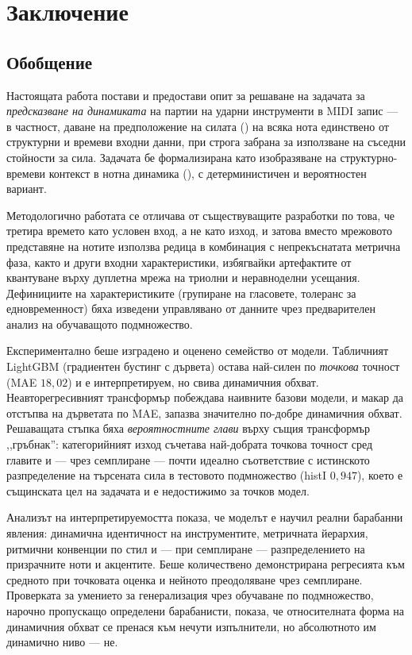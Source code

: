 \chapter{Заключение}
\label{ch:zaklyuchenie}

\section{Обобщение}
\label{sec:obobshtenie}

Настоящата работа постави и предостави опит за решаване на
задачата за \emph{предсказване на динамиката} на
партии на ударни инструменти в MIDI запис —
в частност, даване на предположение на силата () на всяка нота
единствено от
структурни и времеви входни данни, при строга забрана за използване на съседни
стойности за сила. Задачата бе формализирана като изобразяване на структурно-времеви
контекст в нотна динамика (), с детерминистичен и вероятностен вариант.

Методологично работата се отличава от съществуващите разработки по това,
че третира времето като
условен вход, а не като изход, и затова вместо мрежовото представяне на нотите
използва редица в комбинация с непрекъснатата метрична фаза, както и други
входни характеристики, избягвайки артефактите от квантуване върху дуплетна мрежа на
триолни и неравноделни усещания. Дефинициите на характеристиките (групиране на
гласовете, толеранс за едновременност) бяха изведени управлявано от данните чрез
предварителен анализ на обучаващото подмножество.

Експериментално беше изградено и оценено семейство от модели. Табличният
LightGBM (градиентен бустинг с дървета) остава най-силен по \emph{точкова}
точност (MAE $18{,}02$) и е
интерпретируем, но свива динамичния обхват. Неавторегресивният
трансформър побеждава наивните базови модели, и макар да отстъпва на дърветата по
MAE, запазва значително по-добре динамичния обхват. Решаващата стъпка бяха
\emph{вероятностните глави} върху същия трансформър ,,гръбнак'':
категорийният изход съчетава най-добрата точкова точност сред главите и — чрез семплиране —
почти идеално съответствие с истинското разпределение на търсената сила в тестовото подмножество
(histI $0{,}947$), което е същинската цел на задачата и е недостижимо за
точков модел.

Анализът на интерпретируемостта показа, че моделът е научил реални барабанни
явления: динамична идентичност на инструментите, метричната йерархия, ритмични конвенции по стил
и — при семплиране — разпределението на призрачните ноти и акцентите. Беше количествено
демонстрирана регресията към средното при точковата оценка и нейното преодоляване
чрез семплиране. Проверката за умението за генерализация чрез обучаване по
подмножество, нарочно пропускащо определени барабанисти, показа, че
относителната форма на динамичния обхват се пренася към нечути изпълнители, но абсолютното
им динамично ниво — не.

